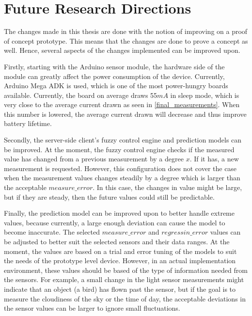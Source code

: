 

\chapter{Future Research Directions} %

The changes made in this thesis are done with the notion of improving on a proof of concept prototype. This means that the changes are done to prove a concept as well. 
Hence, several aspects of the changes implemented can be improved upon.

Firstly, starting with the Arduino sensor module, the hardware side of the module can greatly affect the power consumption of the device. Currently, Arduino Mega ADK is used, which is one of the most power-hungry boards available. Currently, the board on average draws 55$mA$ in sleep mode, which is very close to the average current drawn as seen in \autoref{final_measurements}. When this number is lowered, the average current drawn will decrease and thus improve battery lifetime. 

Secondly, the server-side client's fuzzy control engine and prediction models can be improved. At the moment, the fuzzy control engine checks if the measured value has changed from a previous measurement by a degree $x$. If it has, a new measurement is requested. However, this configuration does not cover the case when the measurement values changes steadily by a degree which is larger than the acceptable $measure\_error$. In this case, the changes in value might be large, but if they are steady, then the future values could still be predictable. 

Finally, the prediction model can be improved upon to better handle extreme values, because currently, a large enough deviation can cause the model to become inaccurate. The selected $measure\_error$ and $regressin\_error$ values can be adjusted to better suit the selected sensors and their data ranges. At the moment, the values are based on a trial and error tuning of the models to suit the needs of the prototype level device. However, in an actual implementation environment, these values should be based of the type of information needed from the sensors. For example, a small change in the light sensor measurements might indicate that an object (a bird) has flown past the sensor, but if the goal is to measure the cloudiness of the sky or the time of day, the acceptable deviations in the sensor values can be larger to ignore small fluctuations.  

















